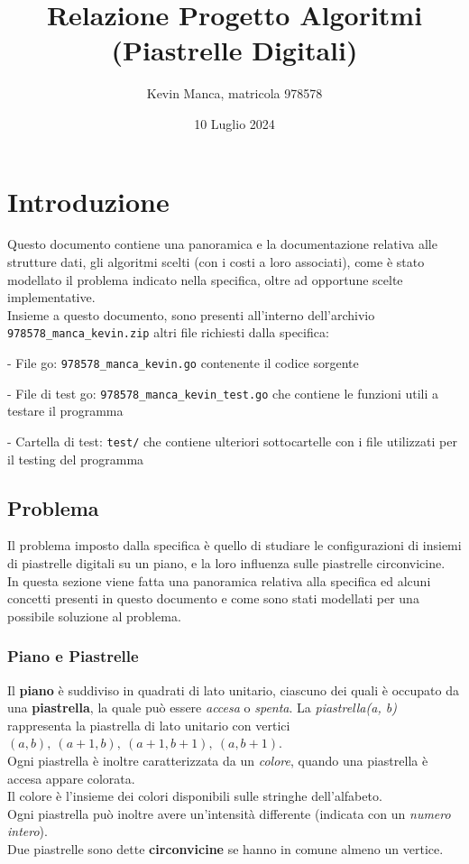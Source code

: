 \documentclass{article}
\title{Relazione Progetto Algoritmi\\ (Piastrelle Digitali)}
\author{Kevin Manca, matricola 978578}
\date{10 Luglio 2024}
\begin{document}
\maketitle
\tableofcontents

\section{Introduzione}\label{sec:intro}
Questo documento contiene una panoramica e la documentazione relativa alle strutture dati, gli algoritmi scelti (con i costi a loro associati), come è stato modellato il problema indicato nella specifica, oltre ad opportune scelte implementative.\\
Insieme a questo documento, sono presenti all'interno dell'archivio \texttt{978578\_manca\_kevin.zip}
altri file richiesti dalla specifica:
 
 - File go: \texttt{978578\_manca\_kevin.go} contenente il codice sorgente
 
 - File di test go: \texttt{978578\_manca\_kevin\_test.go} che contiene le funzioni utili a testare il programma

 - Cartella di test: \texttt{test/} che contiene ulteriori sottocartelle con i file utilizzati per il testing del programma


\subsection{Problema}
Il problema imposto dalla specifica è quello di studiare le configurazioni di insiemi di piastrelle digitali su un piano, e la loro influenza sulle piastrelle circonvicine.\\
In questa sezione viene fatta una panoramica relativa alla specifica ed alcuni concetti presenti in questo documento e come sono stati modellati per una possibile soluzione al problema.  

\subsubsection{Piano e Piastrelle}\label{sec:tiles}
Il \textbf{piano} è suddiviso in quadrati di lato unitario, ciascuno dei quali è occupato da una \textbf{piastrella}, la quale può essere \textit{accesa} o \textit{spenta}.
La \textit{piastrella(a, b)} rappresenta la piastrella di lato unitario con vertici $(a, b),\ (a + 1, b),\ (a + 1, b + 1),\ (a, b + 1)$.\\
Ogni piastrella è inoltre caratterizzata da un \textit{colore}, quando una piastrella è accesa appare colorata.\\
Il colore è l'insieme dei colori disponibili sulle stringhe dell'alfabeto.\\
Ogni piastrella può inoltre avere un'intensità differente (indicata con un \textit{numero intero}).\\
Due piastrelle sono dette \textbf{circonvicine} se hanno in comune almeno un vertice.
\end{document}
